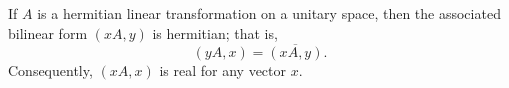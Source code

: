 If $A$ is a hermitian linear transformation on a unitary space, then the associated bilinear form $(xA, y)$ is hermitian; that is,
$$
(yA, x) = \overline{(xA, y)}.
$$
Consequently, $(xA, x)$ is real for any vector $x$.
